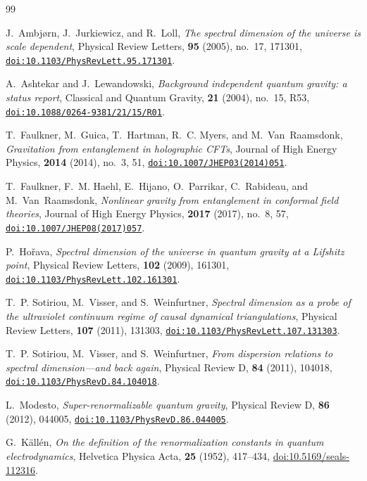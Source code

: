\documentclass[11pt,a4paper,reqno]{amsart}
\theoremstyle{definition}
\numberwithin{equation}{section}
\providecommand{\doi}[1]{\href{https://doi.org/#1}{\nolinkurl{doi:#1}}}
\providecommand{\doi}[1]{\href{https://doi.org/#1}{\nolinkurl{doi:#1}}}
\begin{document}


\begin{thebibliography}{99}

J.~Ambj{\o}rn, J.~Jurkiewicz, and R.~Loll,
\emph{The spectral dimension of the universe is scale dependent},
Physical Review Letters, \textbf{95} (2005), no.~17, 171301,
\doi{10.1103/PhysRevLett.95.171301}.

A.~Ashtekar and J.~Lewandowski,
\emph{Background independent quantum gravity: a status report},
Classical and Quantum Gravity, \textbf{21} (2004), no.~15, R53,
\doi{10.1088/0264-9381/21/15/R01}.

T.~Faulkner, M.~Guica, T.~Hartman, R.~C. Myers, and M.~Van~Raamsdonk,
\emph{Gravitation from entanglement in holographic CFTs},
Journal of High Energy Physics, \textbf{2014} (2014), no.~3, 51,
\doi{10.1007/JHEP03(2014)051}.

T.~Faulkner, F.~M. Haehl, E.~Hijano, O.~Parrikar, C.~Rabideau, and M.~Van~Raamsdonk,
\emph{Nonlinear gravity from entanglement in conformal field theories},
Journal of High Energy Physics, \textbf{2017} (2017), no.~8, 57,
\doi{10.1007/JHEP08(2017)057}.

P.~Ho\v{r}ava,
\emph{Spectral dimension of the universe in quantum gravity at a Lifshitz point},
Physical Review Letters, \textbf{102} (2009), 161301,
\doi{10.1103/PhysRevLett.102.161301}.

T.~P. Sotiriou, M.~Visser, and S.~Weinfurtner,
\emph{Spectral dimension as a probe of the ultraviolet continuum regime of causal dynamical triangulations},
Physical Review Letters, \textbf{107} (2011), 131303,
\doi{10.1103/PhysRevLett.107.131303}.

T.~P. Sotiriou, M.~Visser, and S.~Weinfurtner,
\emph{From dispersion relations to spectral dimension---and back again},
Physical Review D, \textbf{84} (2011), 104018,
\doi{10.1103/PhysRevD.84.104018}.

L.~Modesto,
\emph{Super-renormalizable quantum gravity},
Physical Review D, \textbf{86} (2012), 044005,
\doi{10.1103/PhysRevD.86.044005}.

G.~K{\"a}ll{\'e}n,
\emph{On the definition of the renormalization constants in quantum electrodynamics},
Helvetica Physica Acta, \textbf{25} (1952), 417--434,
\href{https://doi.org/10.5169/seals-112316}{doi:10.5169/seals-112316}.


\end{thebibliography}
\end{document}
